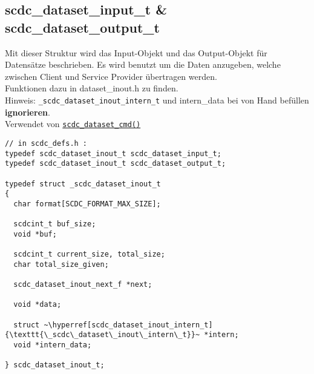 \subsection{scdc\_dataset\_input\_t \& scdc\_dataset\_output\_t}\label{scdc_dataset_input_t}\label{scdc_dataset_output_t}\label{scdc_dataset_inout_t}
Mit dieser Struktur wird das Input-Objekt und das Output-Objekt für Datensätze beschrieben. 
Es wird benutzt um die Daten anzugeben, welche zwischen Client und Service Provider übertragen werden. \\
Funktionen dazu in dataset\_inout.h zu finden.\\
Hinweis: \texttt{\_scdc\_dataset\_inout\_intern\_t} und intern\_data bei von Hand befüllen \textbf{ignorieren}.\\
Verwendet von \hyperref[scdc_dataset_cmd]{\texttt{scdc\_dataset\_cmd()}}\\
\begin{minipage}{\textwidth}
\begin{lstlisting}[escapechar={~}, label={l:scdc_dataset_inout_t}]
// in scdc_defs.h :
typedef scdc_dataset_inout_t scdc_dataset_input_t;
typedef scdc_dataset_inout_t scdc_dataset_output_t;

typedef struct _scdc_dataset_inout_t
{
  char format[SCDC_FORMAT_MAX_SIZE];

  scdcint_t buf_size;
  void *buf;

  scdcint_t current_size, total_size;
  char total_size_given;

  scdc_dataset_inout_next_f *next;

  void *data;

  struct ~\hyperref[scdc_dataset_inout_intern_t]{\texttt{\_scdc\_dataset\_inout\_intern\_t}}~ *intern;
  void *intern_data;
  
} scdc_dataset_inout_t;
\end{lstlisting}
\end{minipage}\\
